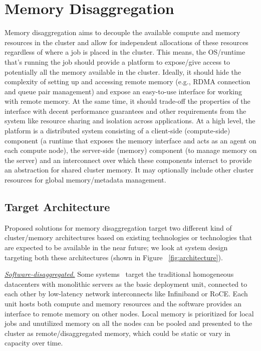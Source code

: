 \section{Memory Disaggregation}
Memory disaggregation aims to decouple the available compute 
and memory resources in the cluster and allow for independent 
allocations of these resources regardless of where a job 
is placed in the cluster. This means, the OS/runtime 
that's running the job should provide a platform to 
expose/give access to potentially all the memory 
available in the cluster. Ideally, it should hide the complexity 
of setting up and accessing remote memory (e.g., RDMA 
connection and queue pair management) and expose an
easy-to-use interface for working with remote memory.
At the same time, it should trade-off the properties 
of the interface with decent performance guarantees 
and other requirements from the system like resource 
sharing and isolation across applications. At a high 
level, the platform is a distributed system consisting 
of a client-side (compute-side) component (a runtime 
that exposes the memory interface and acts as an agent 
on each compute node), the server-side (memory) component 
(to manage memory on the server) and an 
interconnect over which these components 
interact to provide an abstraction for shared cluster memory.
It may optionally include other cluster resources for 
global memory/metadata management.  

\subsection{Target Architecture}
Proposed solutions for memory disaggregation target two 
different kind of cluster/memory architectures based on
existing technologies or technologies that are expected
to be available in the near future; we look at system
design targeting both these architectures (shown in 
Figure ~\ref{fig:architecture}).

\vspace{3pt}
\noindent \uline{\textit{Software-disaggregated.}}
Some systems~\cite{gms,cashmere,infiniswap,remregions,leap,zswap} 
target the traditional homogeneous 
datacenters with monolithic servers as the basic 
deployment unit, connected to each other by low-latency 
network interconnects like Infiniband or RoCE. Each 
unit hosts both compute and memory resources and the 
software provides an interface to remote memory 
on other nodes. Local memory is prioritized for 
local jobs and unutilized memory on all the nodes 
can be pooled and presented to the cluster as 
remote/disaggregated memory, which could be static 
or vary in capacity over time. 

